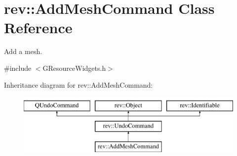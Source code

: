 \hypertarget{classrev_1_1_add_mesh_command}{}\section{rev\+::Add\+Mesh\+Command Class Reference}
\label{classrev_1_1_add_mesh_command}


Add a mesh.  




{\ttfamily \#include $<$G\+Resource\+Widgets.\+h$>$}

Inheritance diagram for rev\+::Add\+Mesh\+Command\+:\begin{figure}[H]
\begin{center}
\leavevmode
\includegraphics[height=3.000000cm]{classrev_1_1_add_mesh_command}
\end{center}
\end{figure}
